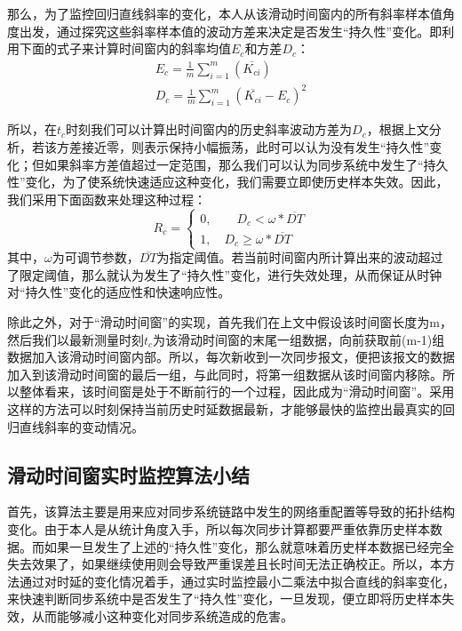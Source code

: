 那么，为了监控回归直线斜率的变化，本人从该滑动时间窗内的所有斜率样本值角度出发，通过探究这些斜率样本值的波动方差来决定是否发生“持久性”变化。即利用下面的式子来计算时间窗内的斜率均值$E_{c}$和方差$D_{c}$：
\begin{align}
E_{c} = \frac{1}{m}\sum_{i=1}^{m}(\overline{K_{ci}}) \\
D_{c} = \frac{1}{m}\sum_{i=1}^{m}(\overline{K_{ci}} - E_{c}) ^ {2}
\end{align}

所以，在$t_{c}$时刻我们可以计算出时间窗内的历史斜率波动方差为$D_{c}$，根据上文分析，若该方差接近零，则表示保持小幅振荡，此时可以认为没有发生“持久性”变化；但如果斜率方差值超过一定范围，那么我们可以认为同步系统中发生了“持久性”变化，为了使系统快速适应这种变化，我们需要立即使历史样本失效。因此，我们采用下面函数来处理这种过程：
\begin{equation}
R_{c} = \left\{
	\begin{array}{ll} %
		0, \qquad D_{c} < \omega * \overline{DT} \\
		1, \quad D_{c} \geq \omega * \overline{DT} 
	\end{array}
	\right. 
\end{equation}
其中，$\omega$为可调节参数，$\overline{DT}$为指定阈值。若当前时间窗内所计算出来的波动超过了限定阈值，那么就认为发生了“持久性”变化，进行失效处理，从而保证从时钟对“持久性”变化的适应性和快速响应性。

除此之外，对于“滑动时间窗”的实现，首先我们在上文中假设该时间窗长度为m，然后我们以最新测量时刻$t_{c}$为该滑动时间窗的末尾一组数据，向前获取前(m-1)组数据加入该滑动时间窗内部。所以，每次新收到一次同步报文，便把该报文的数据加入到该滑动时间窗的最后一组，与此同时，将第一组数据从该时间窗内移除。所以整体看来，该时间窗是处于不断前行的一个过程，因此成为“滑动时间窗”。采用这样的方法可以时刻保持当前历史时延数据最新，才能够最快的监控出最真实的回归直线斜率的变动情况。

\subsection{滑动时间窗实时监控算法小结}
首先，该算法主要是用来应对同步系统链路中发生的网络重配置等导致的拓扑结构变化。由于本人是从统计角度入手，所以每次同步计算都要严重依靠历史样本数据。而如果一旦发生了上述的“持久性”变化，那么就意味着历史样本数据已经完全失去效果了，如果继续使用则会导致严重误差且长时间无法正确校正。所以，本方法通过对时延的变化情况着手，通过实时监控最小二乘法中拟合直线的斜率变化，来快速判断同步系统中是否发生了“持久性”变化，一旦发现，便立即将历史样本失效，从而能够减小这种变化对同步系统造成的危害。

